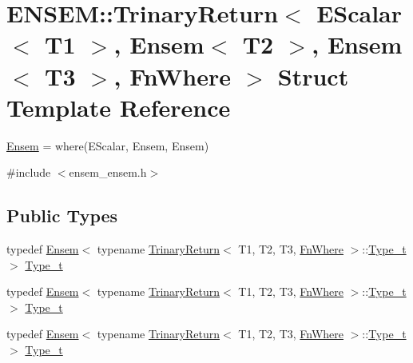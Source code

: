 \hypertarget{structENSEM_1_1TrinaryReturn_3_01EScalar_3_01T1_01_4_00_01Ensem_3_01T2_01_4_00_01Ensem_3_01T3_01_4_00_01FnWhere_01_4}{}\section{E\+N\+S\+EM\+:\+:Trinary\+Return$<$ E\+Scalar$<$ T1 $>$, Ensem$<$ T2 $>$, Ensem$<$ T3 $>$, Fn\+Where $>$ Struct Template Reference}
\label{structENSEM_1_1TrinaryReturn_3_01EScalar_3_01T1_01_4_00_01Ensem_3_01T2_01_4_00_01Ensem_3_01T3_01_4_00_01FnWhere_01_4}


\mbox{\hyperlink{classENSEM_1_1Ensem}{Ensem}} = where(\+E\+Scalar, Ensem, Ensem)  




{\ttfamily \#include $<$ensem\+\_\+ensem.\+h$>$}

\subsection*{Public Types}
\begin{DoxyCompactItemize}
\item 
typedef \mbox{\hyperlink{classENSEM_1_1Ensem}{Ensem}}$<$ typename \mbox{\hyperlink{structENSEM_1_1TrinaryReturn}{Trinary\+Return}}$<$ T1, T2, T3, \mbox{\hyperlink{structENSEM_1_1FnWhere}{Fn\+Where}} $>$\+::\mbox{\hyperlink{structENSEM_1_1TrinaryReturn_3_01EScalar_3_01T1_01_4_00_01Ensem_3_01T2_01_4_00_01Ensem_3_01T3_01_4_00_01FnWhere_01_4_a2b7715b3629c4779ca69a18ca98336e9}{Type\+\_\+t}} $>$ \mbox{\hyperlink{structENSEM_1_1TrinaryReturn_3_01EScalar_3_01T1_01_4_00_01Ensem_3_01T2_01_4_00_01Ensem_3_01T3_01_4_00_01FnWhere_01_4_a2b7715b3629c4779ca69a18ca98336e9}{Type\+\_\+t}}
\item 
typedef \mbox{\hyperlink{classENSEM_1_1Ensem}{Ensem}}$<$ typename \mbox{\hyperlink{structENSEM_1_1TrinaryReturn}{Trinary\+Return}}$<$ T1, T2, T3, \mbox{\hyperlink{structENSEM_1_1FnWhere}{Fn\+Where}} $>$\+::\mbox{\hyperlink{structENSEM_1_1TrinaryReturn_3_01EScalar_3_01T1_01_4_00_01Ensem_3_01T2_01_4_00_01Ensem_3_01T3_01_4_00_01FnWhere_01_4_a2b7715b3629c4779ca69a18ca98336e9}{Type\+\_\+t}} $>$ \mbox{\hyperlink{structENSEM_1_1TrinaryReturn_3_01EScalar_3_01T1_01_4_00_01Ensem_3_01T2_01_4_00_01Ensem_3_01T3_01_4_00_01FnWhere_01_4_a2b7715b3629c4779ca69a18ca98336e9}{Type\+\_\+t}}
\item 
typedef \mbox{\hyperlink{classENSEM_1_1Ensem}{Ensem}}$<$ typename \mbox{\hyperlink{structENSEM_1_1TrinaryReturn}{Trinary\+Return}}$<$ T1, T2, T3, \mbox{\hyperlink{structENSEM_1_1FnWhere}{Fn\+Where}} $>$\+::\mbox{\hyperlink{structENSEM_1_1TrinaryReturn_3_01EScalar_3_01T1_01_4_00_01Ensem_3_01T2_01_4_00_01Ensem_3_01T3_01_4_00_01FnWhere_01_4_a2b7715b3629c4779ca69a18ca98336e9}{Type\+\_\+t}} $>$ \mbox{\hyperlink{structENSEM_1_1TrinaryReturn_3_01EScalar_3_01T1_01_4_00_01Ensem_3_01T2_01_4_00_01Ensem_3_01T3_01_4_00_01FnWhere_01_4_a2b7715b3629c4779ca69a18ca98336e9}{Type\+\_\+t}}
\end{DoxyCompactItemize}


